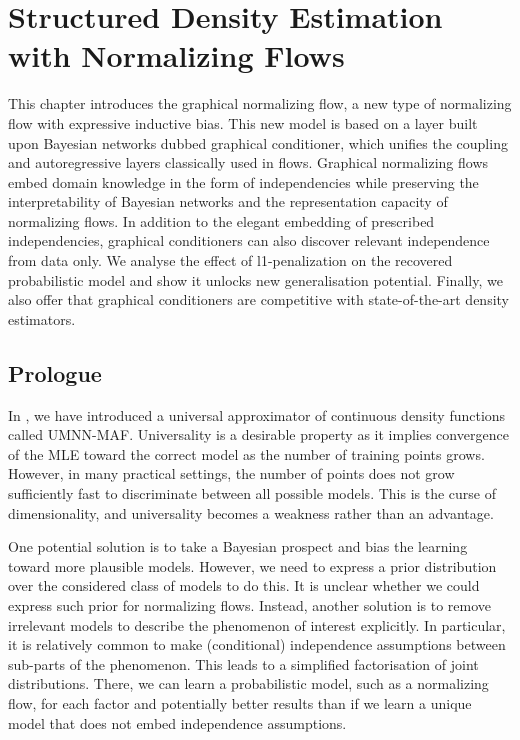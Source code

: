 

\chapter{Structured Density Estimation with Normalizing Flows}\label{ch:06}

\begin{chapter_outline}

  This chapter introduces the graphical normalizing flow, a new type of normalizing flow with expressive inductive bias. This new model is based on a layer built upon Bayesian networks dubbed graphical conditioner, which unifies the coupling and autoregressive layers classically used in flows. Graphical normalizing flows embed domain knowledge in the form of independencies while preserving the interpretability of Bayesian networks and the representation capacity of normalizing flows. In addition to the elegant embedding of prescribed independencies, graphical conditioners can also discover relevant independence from data only. We analyse the effect of l1-penalization on the recovered probabilistic model and show it unlocks new generalisation potential. Finally, we also offer that graphical conditioners are competitive with state-of-the-art density estimators.
\end{chapter_outline}

\section{Prologue}
In , we have introduced a universal approximator of continuous density functions called UMNN-MAF. Universality is a desirable property as it implies convergence of the MLE toward the correct model as the number of training points grows. However, in many practical settings, the number of points does not grow sufficiently fast to discriminate between all possible models. This is the curse of dimensionality, and universality becomes a weakness rather than an advantage.

One potential solution is to take a Bayesian prospect and bias the learning toward more plausible models. However, we need to express a prior distribution over the considered class of models to do this. It is unclear whether we could express such prior for normalizing flows. Instead, another solution is to remove irrelevant models to describe the phenomenon of interest explicitly. In particular, it is relatively common to make (conditional) independence assumptions between sub-parts of the phenomenon. This leads to a simplified factorisation of joint distributions. There, we can learn a probabilistic model, such as a normalizing flow, for each factor and potentially better results than if we learn a unique model that does not embed independence assumptions.

